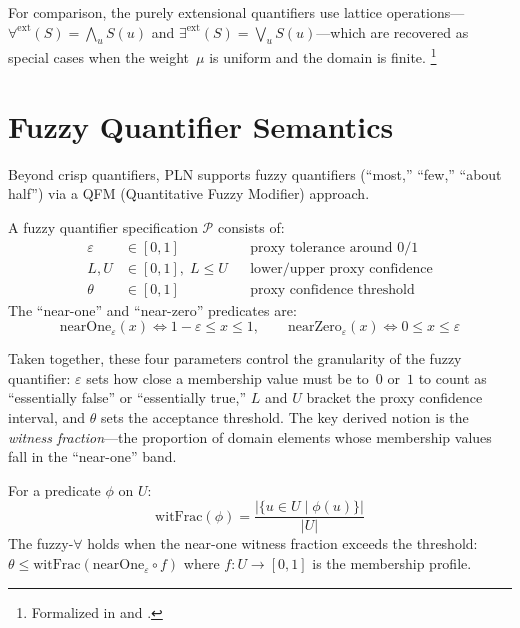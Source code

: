 \documentclass[11pt,openany]{report}
\begin{document}
For comparison, the purely extensional quantifiers use lattice
operations---$\forall^{\mathrm{ext}}(S) = \bigwedge_u S(u)$
and $\exists^{\mathrm{ext}}(S) = \bigvee_u S(u)$---which are recovered
as special cases when the weight~$\mu$ is uniform and the domain is
finite.%
\footnote{Formalized in 
  and .}

\section{Fuzzy Quantifier Semantics}

Beyond crisp quantifiers, PLN supports fuzzy quantifiers (``most,''
``few,'' ``about half'') via a QFM (Quantitative Fuzzy Modifier) approach.

\begin{definition}
A fuzzy quantifier specification $\mathcal{P}$ consists of:
\begin{align}
  \varepsilon &\in [0,1] && \text{proxy tolerance around 0/1} \\
  L, U &\in [0,1],\; L \le U && \text{lower/upper proxy confidence} \\
  \theta &\in [0,1] && \text{proxy confidence threshold}
\end{align}
The ``near-one'' and ``near-zero'' predicates are:
\[
  \mathrm{nearOne}_\varepsilon(x) \iff 1 - \varepsilon \le x \le 1, \qquad
  \mathrm{nearZero}_\varepsilon(x) \iff 0 \le x \le \varepsilon
\]
\end{definition}

Taken together, these four parameters control the granularity of the
fuzzy quantifier: $\varepsilon$ sets how close a membership value must be
to~$0$ or~$1$ to count as ``essentially false'' or ``essentially true,''
$L$ and $U$ bracket the proxy confidence interval, and $\theta$ sets the
acceptance threshold.  The key derived notion is the \emph{witness
fraction}---the proportion of domain elements whose membership values
fall in the ``near-one'' band.

\begin{definition}
For a predicate $\phi$ on $U$:
\[
  \mathrm{witFrac}(\phi) = \frac{|\{u \in U \mid \phi(u)\}|}{|U|}
\]
The fuzzy-$\forall$ holds when the near-one witness fraction exceeds
the threshold: $\theta \le \mathrm{witFrac}(\mathrm{nearOne}_\varepsilon \circ f)$
where $f : U \to [0,1]$ is the membership profile.
\end{definition}
\end{document}
